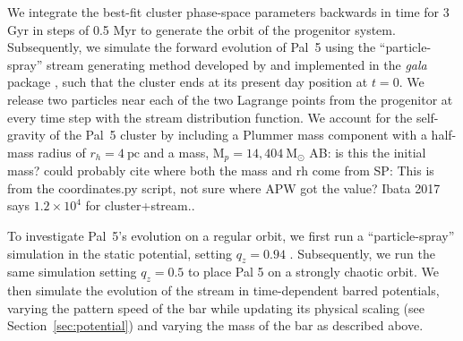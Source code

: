 \documentclass[twocolumn]{aastex62}
\newcommand{\package}[1]{\textsl{#1}}
\newcommand{\msun}{\textrm{M}_\odot}
\newcommand{\ab}[1]{{\color{teal} AB: #1}}
\newcommand{\sa}[1]{{\color{magenta} SP: #1}}
\begin{document}
We integrate the best-fit cluster phase-space parameters backwards in time for 3 Gyr in steps of 0.5 Myr to generate the orbit of the progenitor system. %
Subsequently, we simulate the forward evolution of Pal~5 using the ``particle-spray'' stream generating method developed by \citet{Fardal:2015} and implemented in the \package{gala} package \citep{gala}, such that the cluster ends at its present day position at $t = 0$.
We release two particles near each of the two Lagrange points from the progenitor at every time step with the \citet{Fardal:2015} stream distribution function. %
We account for the self-gravity of the Pal~5 cluster by including a Plummer mass component with a half-mass radius of $r_h = 4~\textrm{pc}$ and a mass, $\textrm{M}_p = 14,404~\msun$ \ab{is this the initial mass? could probably cite where both the mass and rh come from} \sa{This is from the coordinates.py script, not sure where APW got the value? Ibata 2017 says $1.2 \times 10^{4}$ for cluster+stream.}.

To investigate Pal~5's evolution on a regular orbit, we first run a ``particle-spray'' simulation in the static potential, setting $q_z = 0.94$ \citep{Bovy:2016}.
Subsequently, we run the same simulation setting $q_z = 0.5$ to place Pal 5 on a strongly chaotic orbit.
We then simulate the evolution of the stream in time-dependent barred potentials, varying the pattern speed of the bar while updating its physical scaling (see Section~\ref{sec:potential}) and varying the mass of the bar as described above.
\end{document}
